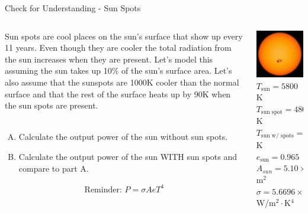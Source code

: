 \documentclass{beamer}
\begin{document}
\begin{frame}{Check for Understanding - Sun Spots}
\begin{columns}
\begin{column}{0.7\textwidth}
   Sun spots are cool places on the sun's surface that show up every 11 years. Even though they are cooler the total radiation from the sun increases when they are present. Let's model this assuming the sun takes up 10\% of the sun's surface area. Let's also assume that the sunspots are 1000K cooler than the normal surface and that the rest of the surface heats up by 90K when the sun spots are present. ~\\~
   \begin{enumerate}[A.]
      \item Calculate the output power of the sun without sun spots.
      \item Calculate the output power of the sun WITH sun spots and compare to part A. ~\\
   \end{enumerate}
   \begin{align*}
      \text{Reminder: } P = \sigma A e T^4
   \end{align*}
\end{column}
\begin{column}{0.36\textwidth}
\begin{center}
   \includegraphics[width=\textwidth]{figures/sunspot.jpg}
   \\$T_\text{sun} = 5800$K
   \\$T_\text{sun spot} = 4800$K
   \\$T_\text{sun w/ spots} = 5890$K
   \\$e_\text{sun}=0.965$
   \\$A_{sun}=5.10\times10^{14}$ m$^2$
   \\$\sigma = 5.6696 \times 10^{-8}$ W/m$^2\cdot$K$^4$
\end{center}
\end{column}
\end{columns}
\end{frame}
\end{document}

